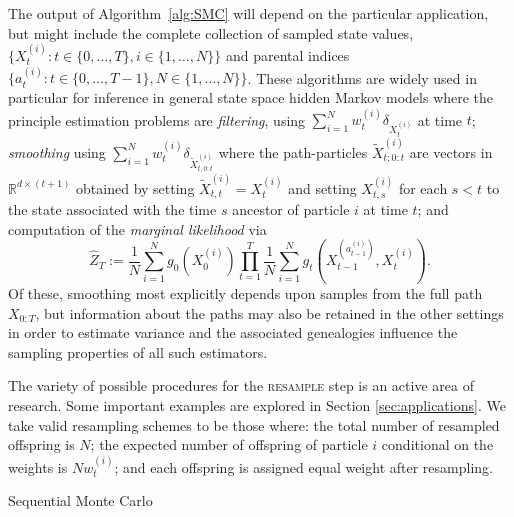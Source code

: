 \documentclass{article}
\theoremstyle{definition}
\newcommand{\1}[1]{\mathbbm{1}_{\{#1\}}}
\begin{document}
The output of Algorithm~\ref{alg:SMC} will depend on the particular application, but might include the complete collection of sampled state values, $\{X_t^{(i)}: t\in\{0,\ldots,T\}, i \in\{1,\ldots,N\}\}$ and parental indices $\{a_t^{(i)}:t\in\{0,\ldots,T-1\},N\in\{1,\ldots,N\}\}$. These algorithms are widely used in particular for inference in general state space hidden Markov models where the principle estimation problems are \textit{filtering}, using
$\sum_{i=1}^N w_t^{(i)} \delta_{X_t^{(i)}}$ at time $t$; \textit{smoothing} using
  $\sum_{i=1}^N w_t^{(i)} \delta_{\tilde{X}_{t,0:t}^{(i)}}$
  where the path-particles $\tilde{X}_{t:0:t}^{(i)}$ are vectors in $\mathbb{R}^{d\times(t+1)}$ obtained by setting $\tilde{X}_{t,t}^{(i)} = X_{t}^{(i)}$ and setting $X_{t,s}^{(i)}$ for each $s < t$ to the state associated with the time $s$ ancestor of particle $i$ at time $t$;
  and computation of the \emph{marginal likelihood} via $$\hat{Z}_T := \frac{1}{N} \sum_{i=1}^N g_0(X_0^{(i)}) \prod_{t=1}^T \frac{1}{N} \sum_{i=1}^N g_t(X_{t-1}^{(a_{t-1}^{(i)})}, X_t^{(i)}).$$ Of these, smoothing most explicitly depends upon samples from the full path $X_{0:T}$, but information about the paths may also be retained in the other settings in order to estimate variance \citep{lee2018, olsson2019} and the associated genealogies influence the sampling properties of all such estimators.

The variety of possible procedures for the \textsc{resample} step is an active area of research. Some important examples are explored in Section \ref{sec:applications}.
We  take valid resampling schemes to be those where: the total number of resampled offspring is $N$; the expected number of offspring of particle $i$ conditional on the weights is $N w_t^{(i)}$; and each offspring is assigned equal weight after resampling.

\vspace{10pt}
\begin{algorithm}
\DontPrintSemicolon
{}
\caption{Sequential Monte Carlo}\label{alg:SMC}
\end{algorithm}
\vspace{10pt}
\end{document}

